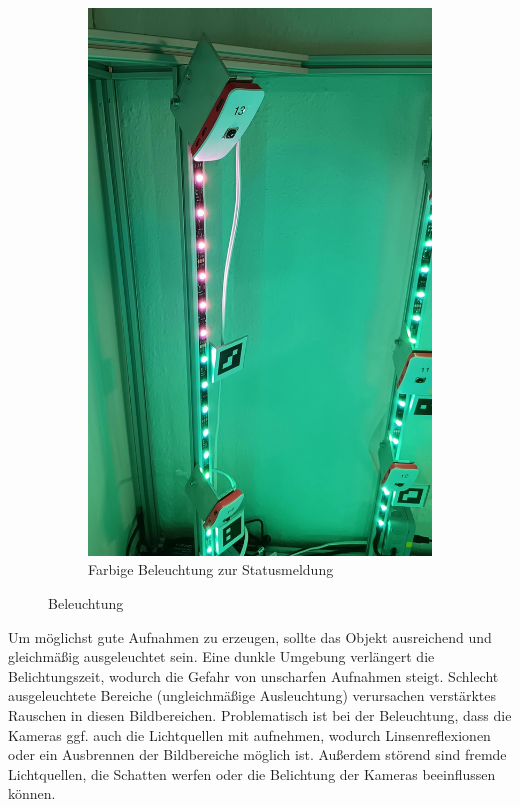 \documentclass[./00PhotoBox.tex]{subfiles}
\begin{document}
\begin{figure}
\begin{subfigure}{0.45\textwidth}
        \includegraphics[height=1.2\linewidth]{./img/beleuchtung_farbig.jpg}
        \centering
        \caption{Farbige Beleuchtung zur Statusmeldung}
        \label{img:led_farbig}
    \end{subfigure}
    \caption{Beleuchtung}
\end{figure}

Um möglichst gute Aufnahmen zu erzeugen, sollte das Objekt ausreichend und gleichmäßig ausgeleuchtet sein. Eine dunkle Umgebung verlängert die Belichtungszeit, wodurch die Gefahr von unscharfen Aufnahmen steigt. Schlecht ausgeleuchtete Bereiche (ungleichmäßige Ausleuchtung) verursachen verstärktes Rauschen in diesen Bildbereichen. Problematisch ist bei der Beleuchtung, dass die Kameras ggf. auch die Lichtquellen mit aufnehmen, wodurch Linsenreflexionen oder ein Ausbrennen der Bildbereiche möglich ist. Außerdem störend sind fremde Lichtquellen, die Schatten werfen oder die Belichtung der Kameras beeinflussen können.
\end{document}
